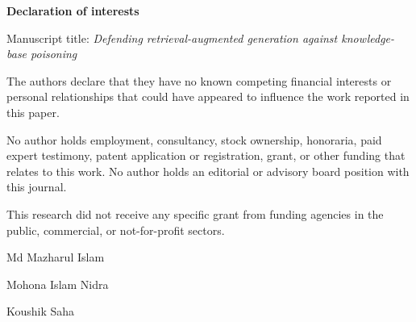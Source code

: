 \documentclass[12pt]{article}
\begin{document}
\begin{center}
{\large\bfseries Declaration of interests}
\end{center}

\bigskip

\noindent Manuscript title: \emph{Defending retrieval-augmented generation against
knowledge-base poisoning}

\bigskip

\noindent The authors declare that they have no known competing financial interests or
personal relationships that could have appeared to influence the work reported in this paper.

\bigskip

\noindent No author holds employment, consultancy, stock ownership, honoraria, paid expert
testimony, patent application or registration, grant, or other funding that relates to this
work. No author holds an editorial or advisory board position with this journal.

\bigskip

\noindent This research did not receive any specific grant from funding agencies in the
public, commercial, or not-for-profit sectors.

\bigskip
\bigskip

\noindent Md Mazharul Islam

\medskip

\noindent Mohona Islam Nidra

\medskip

\noindent Koushik Saha
\end{document}
